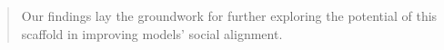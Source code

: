 \begin{abstract}
Our findings lay the groundwork for further exploring the potential of this scaffold in improving models' social alignment.
\end{abstract}
\noindent{}
